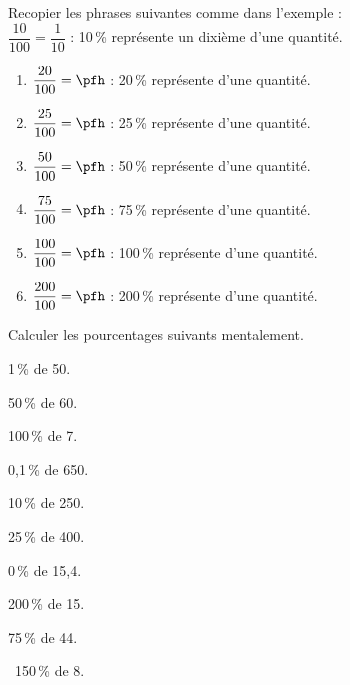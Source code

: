 \begin{colonne*exercice}


\begin{exercice} %
   Recopier les phrases suivantes comme dans l'exemple : \\ [1mm]
   $\dfrac{10}{100} =\dfrac{1}{10}$ : 10\,\% représente un dixième d'une quantité. \bigskip
   \begin{enumerate}
      \item $\dfrac{20}{100} =\pfh$ : 20\,\% représente \pfb d'une quantité. \bigskip
      \item $\dfrac{25}{100} =\pfh$ : 25\,\% représente \pfb d'une quantité. \bigskip
      \item $\dfrac{50}{100} =\pfh$ : 50\,\% représente \pfb d'une quantité. \bigskip
      \item $\dfrac{75}{100} =\pfh$ : 75\,\% représente \pfb d'une quantité. \bigskip
      \item $\dfrac{100}{100} =\pfh$ : 100\,\% représente \pfb d'une quantité. \bigskip
      \item $\dfrac{200}{100} =\pfh$ : 200\,\% représente \pfb d'une quantité. \\
   \end{enumerate}
\end{exercice}


\begin{exercice} %
   Calculer les pourcentages suivants mentalement.
   \begin{colenumerate}{2}
      \item 1\,\% de 50.
      \item 50\,\% de 60.
      \item 100\,\% de 7.
      \item 0,1\,\% de 650.
      \item 10\,\% de 250.
      \item 25\,\% de 400.
      \item 0\,\% de 15,4.
      \item 200\,\% de 15.
      \item 75\,\% de 44.
      \item \, 150\,\% de 8. \\
   \end{colenumerate}
\end{exercice}



\end{colonne*exercice}
